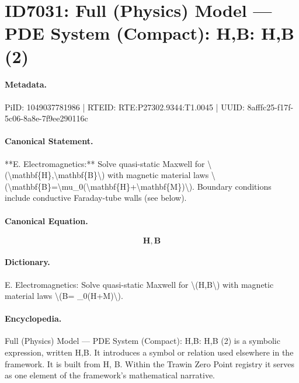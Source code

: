 \section*{ID7031: Full (Physics) Model — PDE System (Compact): H,B: H,B (2)}
\paragraph{Metadata.}
PiID: 1049037781986 | RTEID: RTE:P27302.9344:T1.0045 | UUID: 8afffc25-f17f-5c06-8a8e-7f9ee290116c

\paragraph{Canonical Statement.}
**E. Electromagnetics:** Solve quasi-static Maxwell for \textbackslash{}(\textbackslash{}mathbf\{H\},\textbackslash{}mathbf\{B\}\textbackslash{}) with magnetic material laws \textbackslash{}(\textbackslash{}mathbf\{B\}=\textbackslash{}mu\_0(\textbackslash{}mathbf\{H\}+\textbackslash{}mathbf\{M\})\textbackslash{}). Boundary conditions include conductive Faraday-tube walls (see below).

\paragraph{Canonical Equation.}
\[
\mathbf{H},\mathbf{B}
\]

\paragraph{Dictionary.}
E. Electromagnetics: Solve quasi-static Maxwell for \textbackslash{}(H,B\textbackslash{}) with magnetic material laws \textbackslash{}(B= \_0(H+M)\textbackslash{}).

\paragraph{Encyclopedia.}
Full (Physics) Model — PDE System (Compact): H,B: H,B (2) is a symbolic expression, written H,B. It introduces a symbol or relation used elsewhere in the framework. It is built from H, B. Within the Trawin Zero Point registry it serves as one element of the framework's mathematical narrative.
